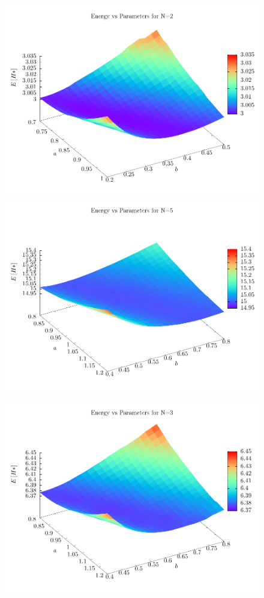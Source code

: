 \begin{figure}[h]
  \begin{minipage}{0.5\textwidth}
    \centering
    \includegraphics[width=\textwidth]{Graphics/surf2.pdf}
    \includegraphics[width=\textwidth]{Graphics/surf5.pdf}
  \end{minipage}
  \begin{minipage}{0.5\textwidth}
    \centering
    \includegraphics[width=\textwidth]{Graphics/surf3.pdf}

\end{minipage}
\end{figure}
